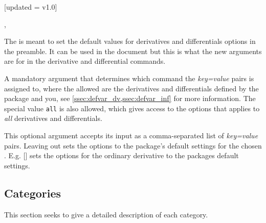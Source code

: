 	\begin{function}{\derivset}[updated = v1.0]
		\begin{syntax}
			, 
		\end{syntax}
		The  is meant to set the default values for derivatives and differentials options in the preamble. It can be used in the document but this is what the new  arguments are for in the derivative and differential commands.
		
		\begin{argument}{1}
			A mandatory argument that determines which command the \emph{key=value} pairs is assigned to, where the allowed  are the derivatives and differentials defined by the package and you, see \cref{ssec:defvar_dv,ssec:defvar_inf} for more information. The special value \texttt{all} is also allowed, which gives access to the options that applies to \textit{all} derivatives and differentials.
		\end{argument}
		
		\begin{argument}{2}
			This optional argument accepts its input as a comma-separated list of \emph{key=value} pairs. Leaving out  sets the options to the package's default settings for the chosen . E.g. \macro{\derivset}[\narg{\macro{\odv}}] sets the options for the ordinary derivative to the packages default settings. %
		\end{argument}
	\end{function}
	
	\subsection{Categories}
	This section seeks to give a detailed description of each category.
	
